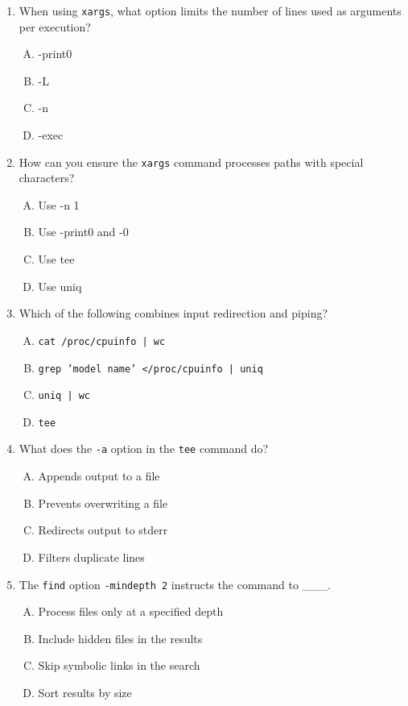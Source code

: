 \documentclass[a4paper]{report}
\begin{document}
\begin{enumerate}[1.]
    \item When using \texttt{xargs}, what option limits the number of lines used as arguments per execution?  
    \begin{enumerate}[A)]
        \item -print0  
        \item -L  
        \item -n  
        \item -exec  
    \end{enumerate}

    \item How can you ensure the \texttt{xargs} command processes paths with special characters?  
    \begin{enumerate}[A)]
        \item Use -n 1  
        \item Use -print0 and -0  
        \item Use tee  
        \item Use uniq  
    \end{enumerate}

    \item Which of the following combines input redirection and piping?  
    \begin{enumerate}[A)]
        \item \texttt{cat /proc/cpuinfo | wc}  
        \item \texttt{grep 'model name' </proc/cpuinfo | uniq}  
        \item \texttt{uniq | wc}  
        \item \texttt{tee}  
    \end{enumerate}

    \item What does the \texttt{-a} option in the \texttt{tee} command do?  
    \begin{enumerate}[A)]
        \item Appends output to a file  
        \item Prevents overwriting a file  
        \item Redirects output to stderr  
        \item Filters duplicate lines  
    \end{enumerate}

    \item The \texttt{find} option \texttt{-mindepth 2} instructs the command to \_\_\_.  
    \begin{enumerate}[A)]
        \item Process files only at a specified depth  
        \item Include hidden files in the results  
        \item Skip symbolic links in the search  
        \item Sort results by size  
    \end{enumerate}


\end{enumerate}
\end{document}
